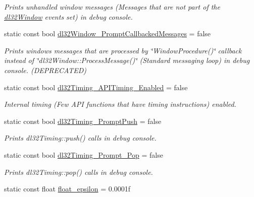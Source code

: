 \begin{DoxyCompactItemize}
\begin{DoxyCompactList}\small\item\em Prints unhandled window messages (Messages that are not part of the \hyperlink{classdl32_window}{dl32\-Window} events set) in debug console. \end{DoxyCompactList}\item 
static const bool \hyperlink{classdl32_global_config_ade572692362bae4fe17bf120425e0175}{dl32\-Window\-\_\-\-Prompt\-Callbacked\-Messages} = false
\begin{DoxyCompactList}\small\item\em Prints windows messages that are processed by \char`\"{}\-Window\-Procedure()\char`\"{} callback instead of \char`\"{}dl32\-Window\-::\-Process\-Message()\char`\"{} (Standard messaging loop) in debug console. (D\-E\-P\-R\-E\-C\-A\-T\-E\-D) \end{DoxyCompactList}\item 
\hypertarget{classdl32_global_config_af791302d231b55a8ff529b7dc6764d91}{static const bool \hyperlink{classdl32_global_config_af791302d231b55a8ff529b7dc6764d91}{dl32\-Timing\-\_\-\-A\-P\-I\-Timing\-\_\-\-Enabled} = false}\label{classdl32_global_config_af791302d231b55a8ff529b7dc6764d91}

\begin{DoxyCompactList}\small\item\em Internal timing (Few A\-P\-I functions that have timing instructions) enabled. \end{DoxyCompactList}\item 
\hypertarget{classdl32_global_config_a9d274508507a8fcd9179bb4ae2c82398}{static const bool \hyperlink{classdl32_global_config_a9d274508507a8fcd9179bb4ae2c82398}{dl32\-Timing\-\_\-\-Prompt\-Push} = false}\label{classdl32_global_config_a9d274508507a8fcd9179bb4ae2c82398}

\begin{DoxyCompactList}\small\item\em Prints dl32\-Timing\-::push() calls in debug console. \end{DoxyCompactList}\item 
\hypertarget{classdl32_global_config_ae996dd3af0d41711a53bc4fb6fa317e1}{static const bool \hyperlink{classdl32_global_config_ae996dd3af0d41711a53bc4fb6fa317e1}{dl32\-Timing\-\_\-\-Prompt\-\_\-\-Pop} = false}\label{classdl32_global_config_ae996dd3af0d41711a53bc4fb6fa317e1}

\begin{DoxyCompactList}\small\item\em Prints dl32\-Timing\-::pop() calls in debug console. \end{DoxyCompactList}\item 
\hypertarget{classdl32_global_config_a588bfd4f14251af91ae947b3b3ce5254}{static const float \hyperlink{classdl32_global_config_a588bfd4f14251af91ae947b3b3ce5254}{float\-\_\-epsilon} = 0.\-0001f}\label{classdl32_global_config_a588bfd4f14251af91ae947b3b3ce5254}


\end{DoxyCompactItemize}
